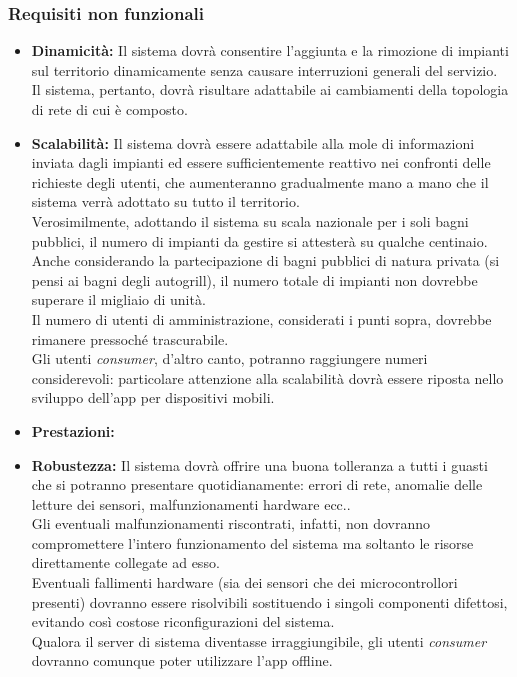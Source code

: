 \documentclass[12pt]{article}
\begin{document}
\subsubsection{Requisiti non funzionali}
\begin{itemize}
\item \textbf{Dinamicità:} Il sistema dovrà consentire l’aggiunta e la rimozione di impianti sul territorio dinamicamente senza causare interruzioni generali del servizio.\\ Il sistema, pertanto, dovrà risultare adattabile ai cambiamenti della topologia di rete di cui è composto.
\item \textbf{Scalabilità:} Il sistema dovrà essere adattabile alla mole di informazioni inviata dagli impianti ed essere sufficientemente reattivo nei confronti delle richieste degli utenti, che aumenteranno gradualmente mano a mano che il sistema verrà adottato su tutto il territorio.\\
Verosimilmente, adottando il sistema su scala nazionale per i soli bagni pubblici, il numero di impianti da gestire si attesterà su qualche centinaio.\\
Anche considerando la partecipazione di bagni pubblici di natura privata (si pensi ai bagni degli autogrill), il numero totale di impianti non dovrebbe superare il migliaio di unità.\\ 
Il numero di utenti di amministrazione, considerati i punti sopra, dovrebbe rimanere pressoché trascurabile.\\
Gli utenti \textit{consumer}, d'altro canto, potranno raggiungere numeri considerevoli: particolare attenzione alla scalabilità dovrà essere riposta nello sviluppo dell'app per dispositivi mobili.
\item \textbf{Prestazioni:}
\item \textbf{Robustezza:} Il sistema dovrà offrire una buona tolleranza a tutti i guasti che si potranno presentare quotidianamente: errori di rete, anomalie delle letture dei sensori,  malfunzionamenti hardware ecc..\\ 
Gli eventuali malfunzionamenti riscontrati, infatti, non dovranno compromettere l'intero funzionamento del sistema ma soltanto le risorse direttamente collegate ad esso.\\ 
Eventuali fallimenti hardware (sia dei sensori che dei microcontrollori presenti) dovranno essere risolvibili sostituendo i singoli componenti difettosi, evitando così costose riconfigurazioni del sistema.\\
Qualora il server di sistema diventasse irraggiungibile, gli utenti \textit{consumer} dovranno comunque poter utilizzare l'app offline.


\end{itemize}
\end{document}
